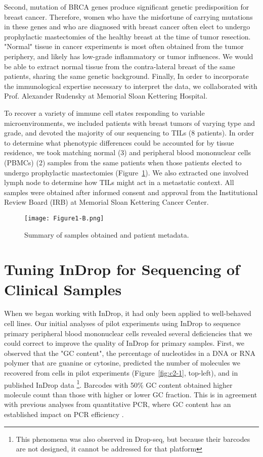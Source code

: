 Second, mutation of BRCA genes produce significant genetic predisposition for breast cancer.
Therefore, women who have the misfortune of carrying mutations in these genes and who are diagnosed with breast cancer often elect to undergo prophylactic mastectomies of the healthy breast at the time of tumor resection. 
"Normal" tissue in cancer experiments is most often obtained from the tumor periphery, and likely has low-grade inflammatory or tumor influences. 
We would be able to extract normal tissue from the contra-lateral breast of the same patients, sharing the same genetic background. %
Finally, In order to incorporate the immunological expertise necessary to interpret the data, we collaborated with Prof. Alexander Rudensky at Memorial Sloan Kettering Hospital.

To recover a variety of immune cell states responding to variable microenvironments, we included patients with breast tumors of varying type and grade, and devoted the majority of our sequencing to TILs (8 patients). 
In order to determine what phenotypic differences could be accounted for by tissue residence, we took matching normal (3) and peripheral blood mononuclear cells (PBMCs) (2) samples from the same patients when those patients elected to undergo prophylactic mastectomies (Figure~\ref{fig:1b}). 
We also extracted one involved lymph node to determine how TILs might act in a metastatic context.  All samples were obtained after informed consent and approval from the Institutional Review Board (IRB) at Memorial Sloan Kettering Cancer Center.

\begin{figure}
\centering
\texttt{[image: Figure1-B.png]}
\caption{Summary of samples obtained and patient metadata.} %
\label{fig:1b}
\end{figure} 

\section{Tuning InDrop for Sequencing of Clinical Samples}

When we began working with InDrop, it had only been applied to well-behaved cell lines. 
Our initial analyses of pilot experiments using InDrop to sequence primary peripheral blood mononuclear cells revealed several deficiencies that we could correct to improve the quality of InDrop for primary samples.
First, we observed that the "GC content", the percentage of nucleotides in a DNA or RNA polymer that are guanine or cytosine, predicted the number of molecules we recovered from cells in pilot experiments (Figure~\ref{fig:c2-1}, top-left), and in published InDrop data \citep{Klein2015}\footnote{This phenomena was also observed in Drop-seq, but because their barcodes are not designed, it cannot be addressed for that platform}.
Barcodes with 50\% GC content obtained higher molecule count than those with higher or lower GC fraction.  
This is in agreement with previous analyses from quantitative PCR, where GC content has an established impact on PCR efficiency \citep{Mamedov2008}. 


